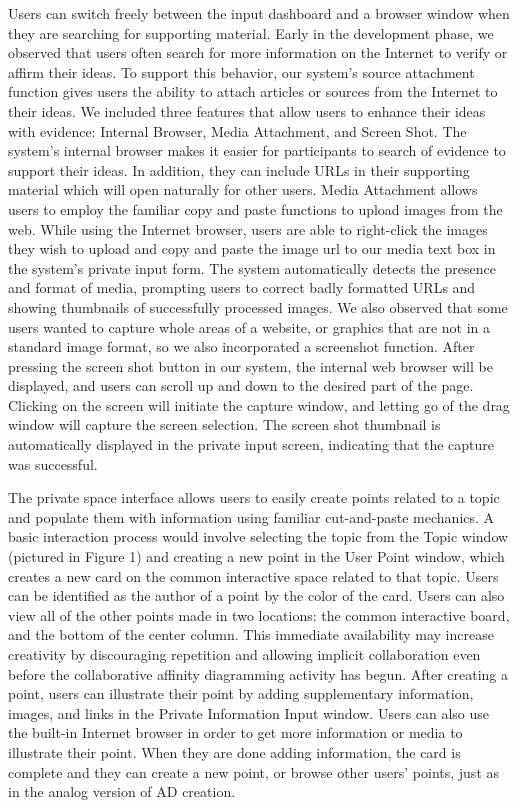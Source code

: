 \documentclass{sigchi}
\begin{document}
Users can switch freely between the input dashboard and a browser window when they are searching for supporting material.  Early in the development phase, we observed that users often search for more information on the Internet to verify or affirm their ideas. To support this behavior, our system's source attachment function gives users the ability to attach articles or sources from the Internet to their ideas. We included three features that allow users to enhance their ideas with evidence: Internal Browser, Media Attachment, and Screen Shot. The system's internal browser makes it easier for participants to search of evidence to support their ideas. In addition, they can include URLs in their supporting material which will open naturally for other users. Media Attachment allows users to employ the familiar copy and paste functions to upload images from the web. While using the Internet browser, users are able to right-click the images they wish to upload and copy and paste the image url to our media text box in the system's private input form. The system automatically detects the presence and format of media, prompting users to correct badly formatted URLs and showing thumbnails of successfully processed images. We also observed that some users wanted to capture whole areas of a website, or graphics that are not in a standard image format, so we also incorporated a screenshot function. After pressing the screen shot button in our system, the internal web browser will be displayed, and users can scroll up and down to the desired part of the page. Clicking on the screen will initiate the capture window, and letting go of the drag window will capture the screen selection. The screen shot thumbnail is automatically displayed in the private input screen, indicating that the capture was successful. 

The private space interface allows users to easily create points related to a topic and populate them with information using familiar cut-and-paste mechanics. A basic interaction process would involve selecting the topic from the Topic window (pictured in Figure 1) and creating a new point in the User Point window, which creates a new card on the common interactive  space related to that topic. Users can be identified as the author of a point by the color of the card. Users can also view all of the other points made in two locations: the common interactive board, and the bottom of the center column. This immediate availability may increase creativity by discouraging repetition and allowing implicit collaboration even before the collaborative affinity diagramming activity has begun. After creating a point, users can illustrate their point by adding supplementary information, images, and links in the Private Information Input window. Users can also use the built-in Internet browser in order to get more information or media to illustrate their point. When they are done adding information, the card is complete and they can create a new point, or browse other users' points, just as in the analog version of AD creation.
\end{document}
